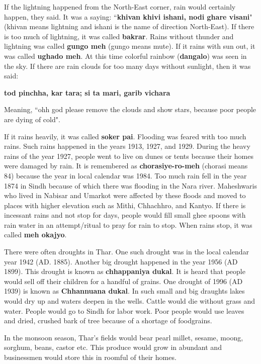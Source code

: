 If the lightning happened from the North-East corner, rain would certainly
happen, they said. It was a saying: ``\textbf{khivan khivi ishani, nodi ghare
visani}" (khivan means lightning and ishani is the name of direction
North-East). If there is too much of lightning, it was called \textbf{bakrar}.
Rains without thunder and lightning was called \textbf{gungo meh} (gungo means
mute). If it rains with sun out, it was called \textbf{ughado meh}. At this
time colorful rainbow (\textbf{dangalo}) was seen in the sky. If there are rain
clouds for too many days without sunlight, then it was said:

\textbf{tod pinchha, kar tara; si ta mari, garib vichara}

Meaning, ``ohh god please remove the clouds and show stars, because poor people
are dying of cold".

If it rains heavily, it was called \textbf{soker pai}. Flooding was feared with
too much rains. Such rains happened in the years 1913, 1927, and 1929. During
the heavy rains of the year 1927, people went to live on dunes or tents because
their homes were damaged by rain. It is remembered as \textbf{chorasiye-ro-meh}
(chorasi means 84) because the year in local calendar was 1984. Too much rain
fell in the year 1874 in Sindh because of which there was flooding in the Nara
river. Maheshwaris who lived in Nabisar and Umarkot were affected by these
floods and moved to places with higher elevation such as Mithi, Chhachhro,
and Kantyo. If there is incessant rains and not stop for days, people would
fill small ghee spoons with rain water in an attempt/ritual to pray for rain to
stop. When rains stop, it was called \textbf{meh okajyo}. 

There were often droughts in Thar. One such drought was in the local calendar
year 1942 (AD. 1885). Another big drought happened in the year 1956 (AD 1899).
This drought is known as \textbf{chhappaniya dukal}. It is heard that people
would sell off their children for a handful of grains. One drought of 1996 (AD
1939) is known as \textbf{Chhannuana dukal}. In such small and big draughts
lakes would dry up and waters deepen in the wells. Cattle would die without
grass and water. People would go to Sindh for labor work. Poor people would use
leaves and dried, crushed bark of tree because of a shortage of foodgrains. 

In the monsoon season, Thar's fields would bear pearl millet, sesame, moong,
sorghum, beans, castor etc. This produce would grow in abundant and businessmen
would store this in roomful of their homes. 


